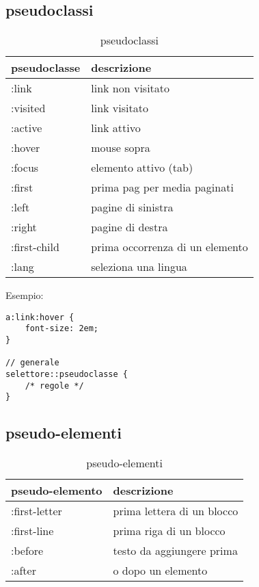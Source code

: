 \documentclass[11pt]{article}
\begin{document}
\subsection{pseudoclassi}
\begin{table}[H]
	\centering
	\begin{tabular}{|l|l|}
		\hline
		pseudoclasse & descrizione \\
		\hline
		:link & link non visitato \\
		:visited & link visitato \\
		:active & link attivo \\
		:hover & mouse sopra \\
		:focus & elemento attivo (tab) \\
		:first & prima pag per media paginati \\
		:left & pagine di sinistra \\
		:right & pagine di destra \\
		:first-child & prima occorrenza di un elemento \\
		:lang & seleziona una lingua \\
		\hline
	\end{tabular}
	\caption{pseudoclassi}
\end{table}

Esempio:
\begin{lstlisting}
a:link:hover {
	font-size: 2em;
}

// generale
selettore::pseudoclasse {
	/* regole */
}
\end{lstlisting}

\subsection{pseudo-elementi}
\begin{table}[H]
	\centering
	\begin{tabular}{|l|l|}
		\hline
		pseudo-elemento & descrizione \\
		\hline
		:first-letter & prima lettera di un blocco \\
		:first-line & prima riga di un blocco \\
		:before & testo da aggiungere prima \\
		:after & o dopo un elemento \\
		\hline
	\end{tabular}
	\caption{pseudo-elementi}
\end{table}
\end{document}
